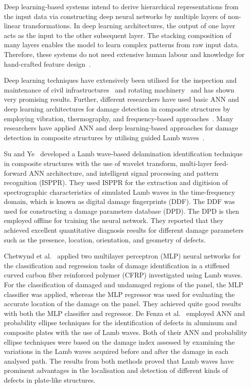 Deep learning-based systems intend to derive hierarchical representations
from the input data via constructing deep neural networks by multiple layers
of non-linear transformations.
In deep learning architectures, the output of one layer acts as the input to the other subsequent layer.
The stacking composition of many layers enables the model to learn complex patterns from raw input data.
Therefore, these systems do not need extensive human labour and knowledge for 
hand-crafted feature design~\cite{Zhao2019b}. %

Deep learning techniques have extensively been utilised for the inspection and
maintenance of civil infrastructures~\cite{cha2017deep, Lin2017a, Liu2019} and 
rotating machinery~\cite{janssens2016convolutional, Jia2016a} and has shown 
very promising results.
Further, different researchers have used basic ANN and deep learning 
architectures for damage detection in composite structures by employing 
vibration, thermography, and frequency-based approaches~\cite{chakraborty2005artificial, Khan2019a, luo2019temporal, 
	bang2020defect}. 
Many researchers have applied ANN and deep learning-based approaches for damage detection in composite structures by utilising guided 
Lamb waves~\cite{Su2004a, chetwynd2008damage, de2015application, feng2019locating, 
	mardanshahi2020detection, qian2020application, Tabian2019, 
	rautela2021ultrasonic}.

Su and Ye~\cite{Su2004a} developed a Lamb wave-based delamination identification 
technique in composite structures with the use of wavelet transform, 
multi-layer feed-forward ANN architecture, and intelligent signal processing and 
pattern recognition (ISPPR).
They used ISPPR for the extraction and digitision of spectrographic characteristics of simulated Lamb waves in the time-frequency domain, which is known as digital damage fingerprints (DDF).
The DDF was used for constructing a damage parameters database (DPD). 
The DPD is then employed offline for training the neural network.  
They reported that they achieved excellent quantitative diagnosis results for different damage parameters such as the presence, location, orientation, and geometry of defects.

Chetwynd et al.~\cite{chetwynd2008damage} applied two multilayer perceptron (MLP) 
neural networks for the classification and regression tasks of
damage identification in a stiffened curved carbon fiber reinforced polymer (CFRP) investigated using Lamb waves.
For the classification of damaged and undamaged regions of the panel, the MLP classifier was applied, whereas the MLP regressor was used for evaluating the accurate location of the damage on the panel. 
They achieved quite good results with both the MLP classifier and regressor.
De Fenza et al.~\cite{de2015application} employed ANN and probability ellipse 
techniques for the identification of defects in aluminum and composite plates 
with the use of Lamb waves.
Both of their ANN and probability ellipse techniques were based on the damage index assessed by examining the variations in the Lamb waves acquired before and after the damage in each analysed path.
The results from both methods proved that Lamb waves have prominent advantages in the localisation and detection of different kinds of defects in plate-like structures. 

